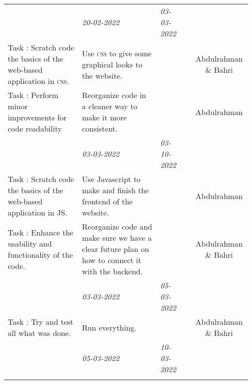 \begin{center}
\begin{small}
\begin{xltabular}{\textwidth}{ p{3cm} p{5cm} X X c }
			\addlinespace
			
			\addlinespace
			& \emph{20-02-2022} & \emph{03-03-2022} & 
			\\ \addlinespace
			
			Task \thesubcounter: 
			Scratch code the basics of the web-based
                        application in \textsc{css}.
			& Use \textsc{css} to give some graphical looks to the website.
			& & & Abdulrahman \& Bahri\\
			
			Task \thesubcounter: 
			Perform minor improvements for code readability
			& Reorganize code in a cleaner way to make it more consistent.
			& & & Abdulrahman \\
			
			\addlinespace
			
					\addlinespace
			& \emph{03-03-2022} & \emph{03-10-2022} & 
			\\ \addlinespace
			
			Task \thesubcounter: 
			Scratch code the basics of the web-based application in JS.
			& Use Javascript to make and finish the frontend of the website.
			& & & Abdulrahman \\
			
			Task \thesubcounter: 
			Enhance the usability and functionality of the code.
			& Reorganize code and make sure we have a clear future plan on how to connect it with the backend.
			& & & Abdulrahman \& Bahri\\
			
			\addlinespace
			
			
			
					\addlinespace
			& \emph{03-03-2022} & \emph{05-03-2022} & 
			\\ \addlinespace
			
			Task \thesubcounter: 
			Try and test all what was done.
			& Run everything.
			& & & Abdulrahman \& Bahri \\

			\addlinespace
			
					\addlinespace
			& \emph{05-03-2022} & \emph{10-03-2022} & 
			\\ \addlinespace
			

\end{xltabular}
\end{small}
\end{center}
